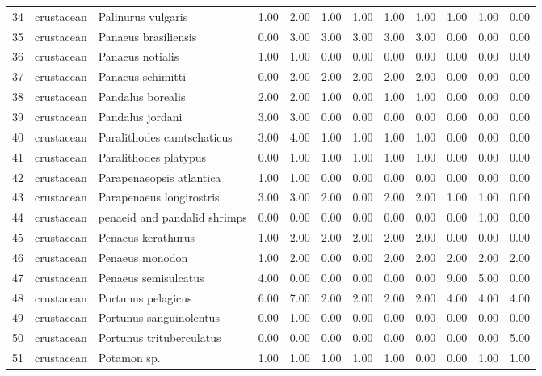 \begin{table}[ht]
\begin{tabular}{rllrrrrrrrrr}
  34 & crustacean & Palinurus vulgaris & 1.00 & 2.00 & 1.00 & 1.00 & 1.00 & 1.00 & 1.00 & 1.00 & 0.00 \\ 
  35 & crustacean & Panaeus brasiliensis & 0.00 & 3.00 & 3.00 & 3.00 & 3.00 & 3.00 & 0.00 & 0.00 & 0.00 \\ 
  36 & crustacean & Panaeus notialis & 1.00 & 1.00 & 0.00 & 0.00 & 0.00 & 0.00 & 0.00 & 0.00 & 0.00 \\ 
  37 & crustacean & Panaeus schimitti & 0.00 & 2.00 & 2.00 & 2.00 & 2.00 & 2.00 & 0.00 & 0.00 & 0.00 \\ 
  38 & crustacean & Pandalus borealis & 2.00 & 2.00 & 1.00 & 0.00 & 1.00 & 1.00 & 0.00 & 0.00 & 0.00 \\ 
  39 & crustacean & Pandalus jordani & 3.00 & 3.00 & 0.00 & 0.00 & 0.00 & 0.00 & 0.00 & 0.00 & 0.00 \\ 
  40 & crustacean & Paralithodes camtschaticus & 3.00 & 4.00 & 1.00 & 1.00 & 1.00 & 1.00 & 0.00 & 0.00 & 0.00 \\ 
  41 & crustacean & Paralithodes platypus & 0.00 & 1.00 & 1.00 & 1.00 & 1.00 & 1.00 & 0.00 & 0.00 & 0.00 \\ 
  42 & crustacean & Parapenaeopsis atlantica & 1.00 & 1.00 & 0.00 & 0.00 & 0.00 & 0.00 & 0.00 & 0.00 & 0.00 \\ 
  43 & crustacean & Parapenaeus longirostris & 3.00 & 3.00 & 2.00 & 0.00 & 2.00 & 2.00 & 1.00 & 1.00 & 0.00 \\ 
  44 & crustacean & penaeid and pandalid shrimps & 0.00 & 0.00 & 0.00 & 0.00 & 0.00 & 0.00 & 0.00 & 1.00 & 0.00 \\ 
  45 & crustacean & Penaeus kerathurus & 1.00 & 2.00 & 2.00 & 2.00 & 2.00 & 2.00 & 0.00 & 0.00 & 0.00 \\ 
  46 & crustacean & Penaeus monodon & 1.00 & 2.00 & 0.00 & 0.00 & 2.00 & 2.00 & 2.00 & 2.00 & 2.00 \\ 
  47 & crustacean & Penaeus semisulcatus & 4.00 & 0.00 & 0.00 & 0.00 & 0.00 & 0.00 & 9.00 & 5.00 & 0.00 \\ 
  48 & crustacean & Portunus pelagicus & 6.00 & 7.00 & 2.00 & 2.00 & 2.00 & 2.00 & 4.00 & 4.00 & 4.00 \\ 
  49 & crustacean & Portunus sanguinolentus & 0.00 & 1.00 & 0.00 & 0.00 & 0.00 & 0.00 & 0.00 & 0.00 & 0.00 \\ 
  50 & crustacean & Portunus trituberculatus & 0.00 & 0.00 & 0.00 & 0.00 & 0.00 & 0.00 & 0.00 & 0.00 & 5.00 \\ 
  51 & crustacean & Potamon sp. & 1.00 & 1.00 & 1.00 & 1.00 & 1.00 & 0.00 & 0.00 & 1.00 & 1.00 \\ 

\end{tabular}
\end{table}
